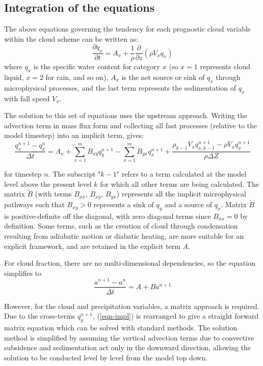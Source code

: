 \documentclass[
a4paper,     %
12pt,        %
article,
onecolumn,   %
openany,     %
]{memoir}
\begin{document}
\subsection{Integration of the equations}
  
The above equations governing the tendency for each prognostic cloud
variable within the cloud scheme can be written as:
\begin{equation}
\frac{\partial {q}_x}{\partial t} = A_x +
\frac{1}{\rho}\frac{\partial}{\partial z} \left( \rho V_x {q}_x \right)
\end{equation}
where $q_x$ is the specific water content for category $x$ (so $x=1$
represents cloud liquid, $x=2$ for rain, and so on), $A_x$ is the net source
or sink of $q_x$ through microphysical processes, and the last term
represents the sedimentation of $q_x$ with fall speed $V_x$.

The solution to this set of equations uses the upstream approach. Writing the
advection term in mass flux form and collecting all fast processes (relative to
the model timestep) into an implicit term, gives:
\begin{equation}
\frac{q_x^{n+1}-q_x^{n}}{\Delta t} = A_x 
+\sum_{x=1}^{m}B_{xy}q_y^{n+1}
-\sum_{x=1}^{m}B_{yx}q_x^{n+1}
+\frac{ 
\rho_{k-1} V_{x} q_{x,k-1}^{n+1} - \rho V_{x} q_{x}^{n+1} }{ \rho \Delta
Z}
\label{eqn-impl}
\end{equation}

for timestep $n$. The subscript "$k-1$" refers to a term calculated at the model
level above the present level $k$ for which all other terms are being
calculated. The matrix $\widetilde{B}$ (with terms $B_{xx}$, $B_{xy}$, $B_{yx}$)
represents all the implicit microphysical pathways such that $B_{xy}>0$
represents a sink of $q_y$ and a source of $q_x$. Matrix $\widetilde{B}$ is
positive-definite off the diagonal, with zero diagonal terms since $B_{xx}=0$ by
definition.  Some terms, such as the creation of cloud through condensation
resulting from adiabatic motion or diabatic heating, are more suitable for an
explicit framework, and are retained in the explicit term $A$.

For cloud fraction, there are no multi-dimensional dependencies, so the equation
simplifies to
\begin{equation}
\frac{a^{n+1}-a^{n}}{\Delta t} = A + Ba^{n+1}
\end{equation}

However, for the cloud and precipitation variables,  a
matrix approach is required. Due to the cross-terms $q_y^{n+1}$, 
(\ref{eqn-impl}) is rearranged to give a straight forward matrix equation which
can be solved with standard methods. 
The solution method is simplified by assuming the vertical advection terms due
to convective subsidence and sedimentation act only in the downward direction,
allowing the solution to be conducted level by level from the model top down.
\end{document}
